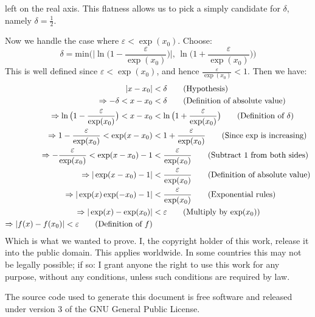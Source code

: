 \documentclass{article}
\theoremstyle{normal}
\begin{document}
    left on the real axis. This flatness allows us to pick a simply candidate
    for $\delta$, namely $\delta=\frac{1}{2}$.
    \par\hfill\par
    Now we handle the case where $\varepsilon<\exp(x_{0})$. Choose:
    \begin{equation}
        \delta=\textrm{min}\Big(
            \big|\ln\big(1-\frac{\varepsilon}{\exp(x_{0})}\big)\big|,\,
            \ln\big(1+\frac{\varepsilon}{\exp(x_{0})}\big)
        \Big)
    \end{equation}
    This is well defined since $\varepsilon<\exp(x_{0})$, and hence
    $\frac{\varepsilon}{\exp(x_{0})}<1$. Then we have:
    \begin{align}
        |x-x_{0}|&<\delta
        \tag{Hypothesis}\\
        \Rightarrow
        -\delta<x-x_{0}&<\delta
        \tag{Definition of absolute value}\\
        \Rightarrow
        \ln\big(1-\frac{\varepsilon}{\exp(x_{0})}\big)
        <x-x_{0}
        &<\ln\big(1+\frac{\varepsilon}{\exp(x_{0})}\big)
        \tag{Definition of $\delta$}\\
        \Rightarrow
        1-\frac{\varepsilon}{\exp(x_{0})}
        <\exp(x-x_{0})
        &<1+\frac{\varepsilon}{\exp(x_{0})}
        \tag{Since $\exp$ is increasing}\\
        \Rightarrow
        -\frac{\varepsilon}{\exp(x_{0})}
        <\exp(x-x_{0})-1
        &<\frac{\varepsilon}{\exp(x_{0})}
        \tag{Subtract 1 from both sides}\\
        \Rightarrow
        |\exp(x-x_{0})-1|&<\frac{\varepsilon}{\exp(x_{0})}
        \tag{Definition of absolute value}\\
        \Rightarrow
        |\exp(x)\exp(-x_{0})-1|&<\frac{\varepsilon}{\exp(x_{0})}
        \tag{Exponential rules}\\
        \Rightarrow
        |\exp(x)-\exp(x_{0})|&<\varepsilon
        \tag{Multiply by $\exp(x_{0})$}\\
        \Rightarrow
        |f(x)-f(x_{0})|<\varepsilon
        \tag{Definition of $f$}
    \end{align}
    Which is what we wanted to prove.
    \newpage
    I, the copyright holder of this work, release it into the public domain.
    This applies worldwide. In some countries this may not be legally possible;
    if so: I grant anyone the right to use this work for any purpose, without
    any conditions, unless such conditions are required by law.
    \par\hfill\par
    The source code used to generate this document is free software and released
    under version 3 of the GNU General Public License.
\end{document}
